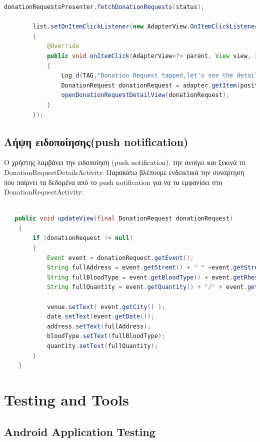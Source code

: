    			
   	\begin{lstlisting}[language=Java]			
        donationRequestsPresenter.fetchDonationRequests(status);

        list.setOnItemClickListener(new AdapterView.OnItemClickListener()
        {
            @Override
            public void onItemClick(AdapterView<?> parent, View view, int position, long id)
            {
                Log.d(TAG,"Donation Request tapped,let's see the details");
                DonationRequest donationRequest = adapter.getItem(position);
                openDonationRequestDetailView(donationRequest);
            }
        });
		\end{lstlisting}
	 	 
	\subsection{Λήψη ειδοποίησης(push notification)}	

		Ο χρήστης λαμβάνει την ειδοποίηση (push notification), την ανοίγει και ξεκινά το DonationRequestDetailsActivity. Παρακάτω βλέπουμε ενδεικτικά την συνάρτηση που παίρνει τα δεδομένα από το push notification για να τα εμφανίσει στο DonationRequestActivity:
   			
   			
   	\begin{lstlisting}[language=Java]			
		
   public void updateView(final DonationRequest donationRequest)
    {
        if (donationRequest != null)
        {
            Event event = donationRequest.getEvent();
            String fullAddress = event.getStreet() + " " +event.getStreetNo();
            String fullBloodType = event.getBloodType() + event.getRhesus();
            String fullQuantity = event.getQuantity() + "/" + event.getQuantityRequired();

            venue.setText( event.getCity() );
            date.setText(event.getDate());
            address.setText(fullAddress);
            bloodType.setText(fullBloodType);
            quantity.setText(fullQuantity);
        }
    }
		\end{lstlisting}
	
	
		
	\section{Testing and Tools}
	
	\subsection{Android Application Testing}
	
